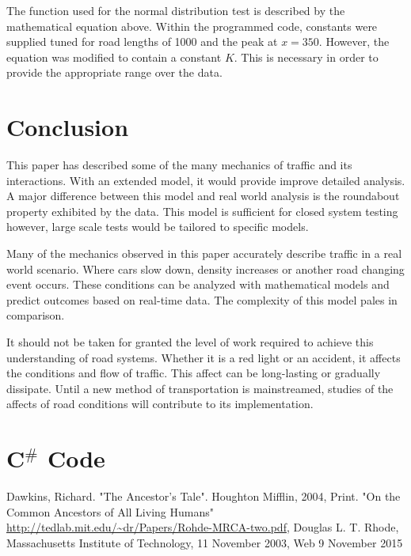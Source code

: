 \documentclass[12pt]{extarticle}
\begin{document}
The function used for the normal distribution test is described by the mathematical equation above. Within the programmed code, constants were supplied tuned for road lengths of 1000 and the peak at $x=350$. However, the equation was modified to contain a constant $K$. This is necessary in order to provide the appropriate range over the data.

\section{Conclusion}

This paper has described some of the many mechanics of traffic and its interactions. With an extended model, it would provide improve detailed analysis. A major difference between this model and real world analysis is the roundabout property exhibited by the data. This model is sufficient for closed system testing however, large scale tests would be tailored to specific models.

Many of the mechanics observed in this paper accurately describe traffic in a real world scenario. Where cars slow down, density increases or another road changing event occurs. These conditions can be analyzed with mathematical models and predict outcomes based on real-time data. The complexity of this model pales in comparison.

It should not be taken for granted the level of work required to achieve this understanding of road systems. Whether it is a red light or an accident, it affects the conditions and flow of traffic. This affect can be long-lasting or gradually dissipate. Until a new method of transportation is mainstreamed, studies of the affects of road conditions will contribute to its implementation.








\newpage

\lstset{basicstyle=\footnotesize,breaklines=true}
\lstset{framextopmargin=50pt,frame=bottomline}

\section{C$^{\#}$ Code}

\newpage
\begin{thebibliography}{99}
Dawkins, Richard. "The Ancestor's Tale". Houghton Mifflin, 2004, Print.
"On the Common Ancestors of All Living Humans" \url{http://tedlab.mit.edu/~dr/Papers/Rohde-MRCA-two.pdf}, Douglas L. T. Rhode, Massachusetts Institute of Technology, 11 November 2003, Web 9 November 2015

\end{thebibliography}
\end{document}

